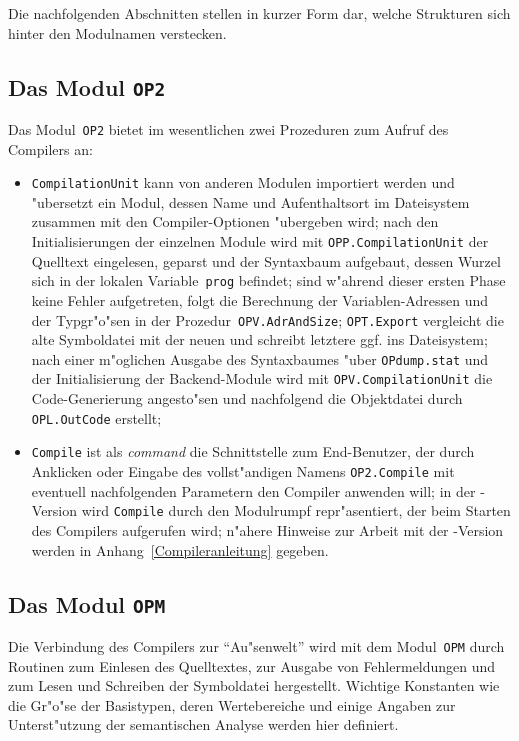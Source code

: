 Die nachfolgenden Abschnitten stellen in kurzer Form dar, welche Strukturen
sich hinter den Modulnamen verstecken.

\subsection{Das Modul {\tt OP2}}

Das Modul~{\tt OP2} bietet im wesentlichen zwei Prozeduren zum Aufruf des
Compilers an:
\begin{itemize}
\item {\tt CompilationUnit} kann von anderen Modulen importiert werden
  und "ubersetzt ein Modul, dessen Name und Aufenthaltsort im Dateisystem zusammen
  mit den Compiler-Optionen "ubergeben wird;
  nach den Initialisierungen der einzelnen Module wird mit {\tt OPP.CompilationUnit}
  der Quelltext eingelesen, geparst und der Syntaxbaum aufgebaut, dessen Wurzel
  sich in der lokalen Variable~{\tt prog} befindet;
  sind w"ahrend dieser ersten Phase keine Fehler aufgetreten, folgt die
  Berechnung der Variablen-Adressen und der Typgr"o"sen in der
  Prozedur~{\tt OPV.AdrAndSize};
  {\tt OPT.Export} vergleicht die alte Symboldatei mit der neuen und schreibt
  letztere ggf. ins Dateisystem;
  nach einer m"oglichen Ausgabe des Syntaxbaumes "uber {\tt OPdump.stat} und
  der Initialisierung der Backend-Module wird mit {\tt OPV.CompilationUnit}
  die Code-Generierung angesto"sen und nachfolgend die Objektdatei durch {\tt OPL.OutCode}
  erstellt;
\item {\tt Compile} ist als {\it command\/} die Schnittstelle zum End-Benutzer, der
  durch Anklicken oder Eingabe des vollst"andigen Namens {\tt OP2.Compile}
  mit eventuell nachfolgenden Parametern den Compiler anwenden will;
  in der \modula-Version wird {\tt Compile} durch den Modulrumpf repr"asentiert, der
  beim Starten des Compilers aufgerufen wird;
  n"ahere Hinweise zur Arbeit mit der \modula-Version werden in
  Anhang~\ref{Compileranleitung} gegeben.
\end{itemize}

\subsection{Das Modul {\tt OPM}}

Die Verbindung des Compilers zur "`Au"senwelt"' wird mit dem Modul~{\tt OPM}
durch Routinen zum Einlesen des Quelltextes, zur Ausgabe von Fehlermeldungen und
zum Lesen und Schreiben der Symboldatei hergestellt.
Wichtige Konstanten wie die Gr"o"se der Basistypen, deren Wertebereiche und
einige Angaben zur Unterst"utzung der semantischen Analyse werden hier
definiert.

